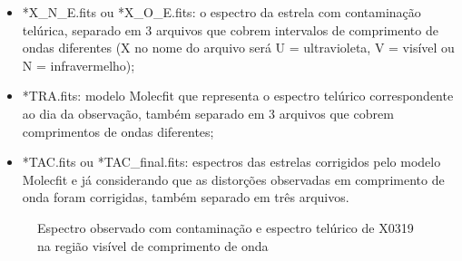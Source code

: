 \begin{itemize}
    \item *X\_N\_E.fits ou *X\_O\_E.fits: o espectro da estrela com contaminação telúrica, separado em 3 arquivos que cobrem intervalos de comprimento de ondas diferentes (X no nome do arquivo será U = ultravioleta, V = visível ou N = infravermelho);
    \item *TRA.fits: modelo Molecfit que representa o espectro telúrico correspondente ao dia da observação, também separado em 3 arquivos que cobrem comprimentos de ondas diferentes;
    \item *TAC.fits ou *TAC\_final.fits: espectros das estrelas corrigidos pelo modelo Molecfit e já considerando que as distorções observadas em comprimento de onda foram corrigidas, também separado em três arquivos.
\end{itemize}


\begin{figure}[htb]
  \centering
  \hfill
  \caption{Espectro observado com contaminação e espectro telúrico de X0319 na região visível de comprimento de onda}
  \label{fig:x0319-visible}
\end{figure}



